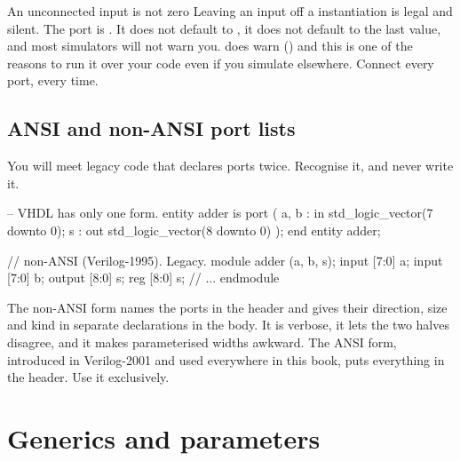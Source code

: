 \begin{gotcha}{An unconnected input is not zero}
Leaving an input off a \SV{} instantiation is legal and silent. The port is
. It does not default to , it does not default to the last
value, and most simulators will not warn you.  does warn
() and this is one of the reasons to run it over your code even
if you simulate elsewhere. Connect every port, every time.
\end{gotcha}

\subsection{ANSI and non-ANSI port lists}

You will meet legacy code that declares ports twice. Recognise it, and never
write it.

\begin{rosetta}
\begin{rleft}
-- VHDL has only one form.
entity adder is
  port (
    a, b : in  std_logic_vector(7 downto 0);
    s    : out std_logic_vector(8 downto 0)
  );
end entity adder;
\end{rleft}
\begin{rright}
// non-ANSI (Verilog-1995). Legacy.
module adder (a, b, s);
  input  [7:0] a;
  input  [7:0] b;
  output [8:0] s;
  reg    [8:0] s;
  // ...
endmodule
\end{rright}
\end{rosetta}

The non-ANSI form names the ports in the header and gives their direction, size
and kind in separate declarations in the body. It is verbose, it lets the two
halves disagree, and it makes parameterised widths awkward. The ANSI form,
introduced in Verilog-2001 and used everywhere in this book, puts everything in
the header. Use it exclusively.

\section{Generics and parameters}
\label{sec:rosetta:params}

